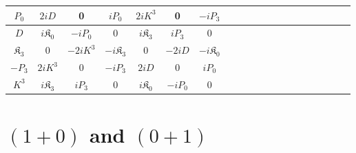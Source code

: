 \documentclass[]{article}
\numberwithin{equation}{section}
\begin{document}
{{\begin{table}[h!]
{\begin{tabular}{ |c||c|c|c|c|c|c|c|c|c|c|c|c|c|c|c|c|c|c|c| }
  \hline 
 \rule{0pt}{16pt}  $P_{{0}}$ &$2iD$&0&$iP_{{0}}$&${2iK^{{3}}}$&0&${-iP_{{3}}}$\\
 \hline
 \rule{0pt}{16pt}$D$ &$i\mathfrak{K}_{{0}}$&$-iP_{{0}}$&0&$i\mathfrak{K}_{{3}}$&$iP_{{3}}$&0\\
 \hline
 \rule{0pt}{16pt}$\mathfrak{K}_{{3}}$ &0&$-{2iK^{{3}}}$&$-i\mathfrak{K}_{{3}}$&0&$-2iD$&${-i\mathfrak{K}_{{0}}}$\\
 \hline 
 \rule{0pt}{16pt}$-P_{{3}}$ &$2iK^{{3}}$&0&$-iP_{{3}}$&$2iD$&0&${iP_{{0}}}$\\
 \hline 
 \rule{0pt}{16pt}$K^{{3}}$ &${i\mathfrak{K}_{{3}}}$&${iP_{{3}}}$&0&${i\mathfrak{K}_{{0}}}$&${-iP_{{0}}}$&0\\
 \hline 
\end{tabular}}
\end{table}

\pagebreak
\section{$(1+0)$ and $(0+1)$}

\begin{table}[h!]
\centering
\caption{\label{tabelinterpolationifd}$0+1$ conformal algebra in IFD}
\end{table}

}}
\end{document}
